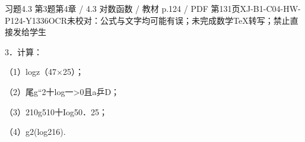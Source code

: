 \begin{bankitem}{习题4.3 第3题}{第4章 / 4.3 对数函数 / 教材 p.124 / PDF 第131页}{XJ-B1-C04-HW-P124-Y1336}{OCR未校对：公式与文字均可能有误；未完成数学TeX转写；禁止直接发给学生}
\begin{ocrdraft}
\par
3．计算：
\par
（1）logz（47\ensuremath{\times}25）；
\par
（2）尾g“2十log一>0且a乒D；
\par
（3）210g510十Iog50．25；
\par
（4）g2(log216).
\end{ocrdraft}
\end{bankitem}

